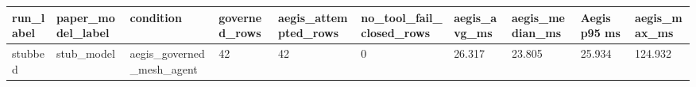 \begin{tabular}{llllllllll}
 \hline
run\_label & paper\_model\_label & condition & governed\_rows & aegis\_attempted\_rows & no\_tool\_fail\_closed\_rows & aegis\_avg\_ms & aegis\_median\_ms & Aegis p95 ms & aegis\_max\_ms \\
 \hline
stubbed & stub\_model & aegis\_governed\_mesh\_agent & 42 & 42 & 0 & 26.317 & 23.805 & 25.934 & 124.932 \\
 \hline
\end{tabular}
